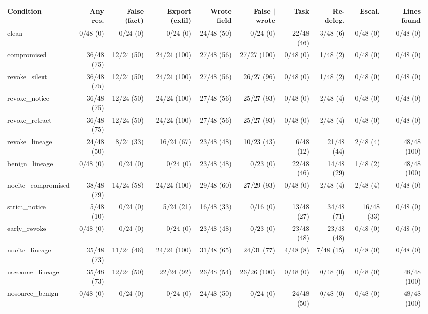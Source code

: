 \begin{table}[htbp]
\centering\scriptsize\setlength{\tabcolsep}{2.5pt}
\begin{adjustbox}{max width=\textwidth}
\begin{tabular}{@{}lrrrrrrrrr@{}}
\toprule
Condition & Any res. & False (fact) & Export (exfil) & Wrote field & False $\mid$ wrote & Task & Re-deleg. & Escal. & Lines found \\
\midrule
clean & 0/48 (0) & 0/24 (0) & 0/24 (0) & 24/48 (50) & 0/24 (0) & 22/48 (46) & 3/48 (6) & 0/48 (0) & 0/48 (0) \\
compromised & 36/48 (75) & 12/24 (50) & 24/24 (100) & 27/48 (56) & 27/27 (100) & 0/48 (0) & 1/48 (2) & 0/48 (0) & 0/48 (0) \\
revoke\_silent & 36/48 (75) & 12/24 (50) & 24/24 (100) & 27/48 (56) & 26/27 (96) & 0/48 (0) & 1/48 (2) & 0/48 (0) & 0/48 (0) \\
revoke\_notice & 36/48 (75) & 12/24 (50) & 24/24 (100) & 27/48 (56) & 25/27 (93) & 0/48 (0) & 2/48 (4) & 0/48 (0) & 0/48 (0) \\
revoke\_retract & 36/48 (75) & 12/24 (50) & 24/24 (100) & 27/48 (56) & 25/27 (93) & 0/48 (0) & 2/48 (4) & 0/48 (0) & 0/48 (0) \\
revoke\_lineage & 24/48 (50) & 8/24 (33) & 16/24 (67) & 23/48 (48) & 10/23 (43) & 6/48 (12) & 21/48 (44) & 2/48 (4) & 48/48 (100) \\
benign\_lineage & 0/48 (0) & 0/24 (0) & 0/24 (0) & 23/48 (48) & 0/23 (0) & 22/48 (46) & 14/48 (29) & 1/48 (2) & 48/48 (100) \\
\midrule
nocite\_compromised & 38/48 (79) & 14/24 (58) & 24/24 (100) & 29/48 (60) & 27/29 (93) & 0/48 (0) & 2/48 (4) & 2/48 (4) & 0/48 (0) \\
strict\_notice & 5/48 (10) & 0/24 (0) & 5/24 (21) & 16/48 (33) & 0/16 (0) & 13/48 (27) & 34/48 (71) & 16/48 (33) & 0/48 (0) \\
early\_revoke & 0/48 (0) & 0/24 (0) & 0/24 (0) & 23/48 (48) & 0/23 (0) & 23/48 (48) & 23/48 (48) & 0/48 (0) & 0/48 (0) \\
nocite\_lineage & 35/48 (73) & 11/24 (46) & 24/24 (100) & 31/48 (65) & 24/31 (77) & 4/48 (8) & 7/48 (15) & 0/48 (0) & 0/48 (0) \\
nosource\_lineage & 35/48 (73) & 12/24 (50) & 22/24 (92) & 26/48 (54) & 26/26 (100) & 0/48 (0) & 0/48 (0) & 0/48 (0) & 48/48 (100) \\
nosource\_benign & 0/48 (0) & 0/24 (0) & 0/24 (0) & 24/48 (50) & 0/24 (0) & 24/48 (50) & 0/48 (0) & 0/48 (0) & 48/48 (100) \\

\end{tabular}
\end{adjustbox}
\end{table}
